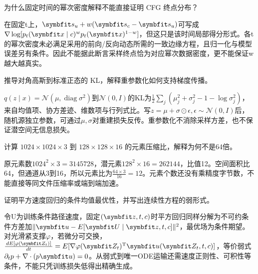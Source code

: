 \begin{exercises}
\begin{exercise} 为什么固定时间的幂次密度解释不能直接证明 CFG 终点分布？

\begin{solution}
在固定t上，$\vect{s}_u+w(\vect{s}_c-\vect{s}_u)$可写成$\nabla\log[p_t(\vect{x}\mid c)^w p_t(\vect{x})^{1-w}]$，但这只是该时间局部得分形式。各t的幂次密度未必满足采用的前向/反向动态所需的一致边缘方程，且归一化与模型误差另有条件。因此不能据此断言采样终点恰为对应幂次数据密度，更不能保证w越大越真实。
\end{solution}
\end{exercise}

\begin{exercise} 推导对角高斯到标准正态的 KL，解释重参数化如何支持梯度传播。

\begin{solution}
$q(z\mid x)=\mathcal N(\mu,\operatorname{diag}\sigma^2)$到$\mathcal N(0,I)$的KL为$\tfrac12\sum_j(\mu_j^2+\sigma_j^2-1-\log\sigma_j^2)$，来自均值项、协方差迹、维数项与行列式比。写$z=\mu+\sigma\odot\epsilon,\epsilon\sim\mathcal N(0,I)$后，随机源独立参数，可通过$\mu,\sigma$对重建损失反传。重参数化不消除采样方差，也不保证潜空间无信息损失。
\end{solution}
\end{exercise}

\begin{exercise} 计算 $1024\times1024\times3$ 到 $128\times128\times16$ 的元素压缩比，解释为何不是64倍。

\begin{solution}
原元素数$1024^2\times3=3145728$，潜元素$128^2\times16=262144$，比值12。空间面积比64，但通道从3到16，所以元素比为$\frac{64\times3}{16}=12$。元素个数还没有乘精度字节数，不能直接等同文件压缩率或端到端加速。
\end{solution}
\end{exercise}

\begin{exercise}\optional 证明平方速度回归的条件均值最优性，并写出连续性方程的弱形式。

\begin{solution}
令U为训练条件路径速度，固定$(\vect{z},t,c)$时平方回归同样分解为不可约条件方差加$\|\vect{u}-E[\vect{U}\mid \vect{z},t,c]\|^2$，最优场为条件期望。对光滑紧支撑$\varphi$，若微分可交换，$\frac{dE[\varphi(\vect{Z}_t)]}{dt}=E[\nabla\varphi(\vect{Z}_t)^{\mathrm{T}}\vect{u}(\vect{Z}_t,t,c)]$，等价弱式$\partial_tp+\nabla\cdot(p\vect{u})=0$。从弱式到唯一ODE运输还需速度正则性、可积性等条件，不能只凭训练损失低得出精确生成。
\end{solution}
\end{exercise}


\end{exercises}
